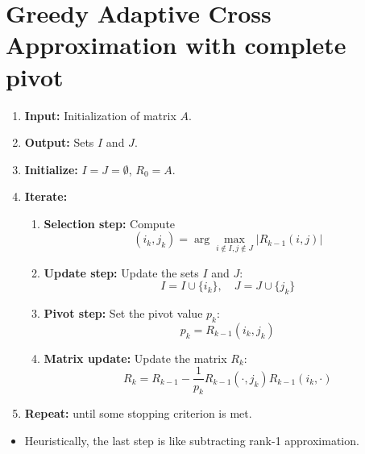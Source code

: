 \documentclass[11pt,reqno]{amsart}
\theoremstyle{remark}
\begin{document}
\begin{sloppypar}
\section{Greedy Adaptive Cross Approximation with complete pivot}
\begin{enumerate}
\item \textbf{Input:} Initialization of matrix $A$.
\item \textbf{Output:} Sets $I$ and $J$.
\item \textbf{Initialize:} $I = J = \emptyset$, $R_0 = A$.
\item \textbf{Iterate:} 
\begin{enumerate}
\item \textbf{Selection step:} Compute 
\[
(i_k, j_k) = \arg\max_{i \not\in I, j \not\in J} |R_{k-1}(i, j)|
\]
\item \textbf{Update step:} Update the sets $I$ and $J$:
\[
I = I \cup \{i_k\}, \quad J = J \cup \{j_k\}
\]
\item \textbf{Pivot step:} Set the pivot value $p_k$:
\[
p_k = R_{k-1}(i_k, j_k)
\]
\item \textbf{Matrix update:} Update the matrix $R_k$:
\[
R_k = R_{k-1} - \frac{1}{p_k}R_{k-1}(\cdot, j_k)R_{k-1}(i_k, \cdot)
\]
\end{enumerate}
\item \textbf{Repeat:} until some stopping criterion is met.
\end{enumerate}
\begin{itemize}
\item Heuristically, the last step is like subtracting rank-1 approximation.
\end{itemize}


\end{sloppypar}
\end{document}
